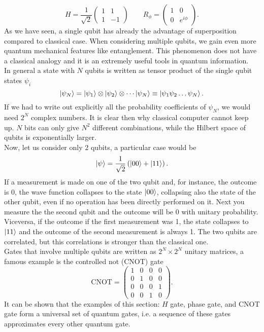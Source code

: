 \begin{equation}
\label{Hadamard}
 H = \frac{1}{\sqrt{2}}\begin{pmatrix}
 1  & 1\\
1 & -1
 \end{pmatrix} \qquad R_\phi = \begin{pmatrix}
 1  & 0\\
0 & e^{i\phi}
 \end{pmatrix}.
\end{equation}
As we have seen, a single qubit has already the advantage of superposition compared to classical case. When considering multiple qubits, we gain even more quantum mechanical features like entanglement. This phenomenon does not have a classical analogy and it is an extremely useful tools in quantum information.\\
In general a state with $N$ qubits is written as tensor product of the single qubit states $\psi_i$
\begin{equation}
\ket{\psi_N} = \ket{\psi_1}\otimes \ket{\psi_2}\otimes \cdots \ket{\psi_N} \equiv \ket{\psi_1\psi_2\dots \psi_N}.
\end{equation}
If we had to write out explicitly all the probability coefficients of $\psi_N$, we would need $2^N$ complex numbers. It is clear then why classical computer cannot keep up. $N$ bits can only give $N^2$ different combinations, while the Hilbert space of qubits is exponentially larger.\\
Now, let us consider only 2 qubits, a particular case would be
\begin{equation}
\ket{\psi} = \frac{1}{\sqrt{2}}\left(\ket{00} + \ket{11}\right).
\end{equation}
If a measurement is made on one of the two qubit and, for instance, the outcome is 0, the wave function collapses to the state $\ket{00}$, collapsing also the state of the other qubit, even if no operation has been directly performed on it. Next you measure the the second qubit and the outcome will be 0 with unitary probability. Viceversa, if the outcome if the first measurement was 1, the state collapses to $\ket{11}$ and the outcome of the second measurement is always 1. The two qubits are correlated, but this correlations is stronger than the classical one.\\
Gates that involve multiple qubits are written as $2^N\times 2^N$ unitary matrices, a famous example is the controlled not (CNOT) gate
\begin{equation}
\text{CNOT} = \begin{pmatrix}
1  & 0 & 0 & 0\\
0 & 1 & 0 & 0\\
0 & 0& 0 & 1 \\
0 & 0 & 1 &0
\end{pmatrix}.
\end{equation}
It can be shown \cite{chuang} that the examples of this section: $H$ gate, phase gate, and CNOT gate form a universal set of quantum gates, i.e. a sequence of these gates approximates every other quantum gate.

